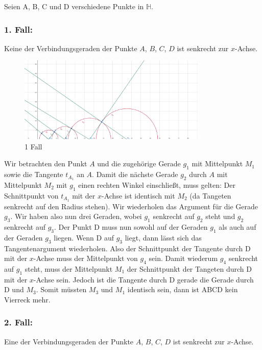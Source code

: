 \documentclass[12pt,a4paper]{article}
\begin{document}
\newpage
\noindent Seien A, B, C und D verschiedene Punkte in $\mathbb{H}$.
\subsubsection*{1. Fall:}
Keine der Verbindungsgeraden der Punkte $A$, $B$, $C$, $D$ ist senkrecht zur $x$-Achse.

\begin{figure}[htbp]
    \centering
    \includegraphics[width=0.8\textwidth]{Blatt08_Aufgabe_22_ia.png}
    \caption{1 Fall}
    \label{fig:Aufgabe_22_ia}
\end{figure}

\noindent Wir betrachten den Punkt $A$ und die zugehörige Gerade $g_1$ mit Mittelpunkt $M_1$ sowie die Tangente $t_{A_1}$ an $A$. Damit die nächste Gerade $g_2$ durch $A$ mit Mittelpunkt $M_2$ mit $g_1$ einen rechten Winkel einschließt, muss gelten: Der Schnittpunkt von $t_{A_1}$ mit der $x$-Achse ist identisch mit $M_2$ (da Tangeten senkrecht auf den Radius stehen). Wir wiederholen das Argument für die Gerade $g_3$. Wir haben also nun drei Geraden, wobei $g_1$ senkrecht auf $g_2$ steht und $g_2$ senkrecht auf $g_3$. Der Punkt D muss nun sowohl auf der Geraden $g_1$ als auch auf der Geraden $g_3$ liegen. Wenn D auf $g_3$ liegt, dann lässt sich das Tangentenargument wiederholen. Also der Schnittpunkt der Tangente durch D mit der $x$-Achse muss der Mittelpunkt von $g_4$ sein. Damit wiederum $g_4$ senkrecht auf $g_1$ steht, muss der Mittelpunkt $M_1$ der Schnittpunkt der Tangeten durch D mit der $x$-Achse sein. Jedoch ist die Tangente durch D gerade die Gerade durch D und $M_3$. Somit müssten $M_3$ und $M_1$ identisch sein, dann ist ABCD kein Vierreck mehr.

\newpage
\subsubsection*{2. Fall:}
Eine der Verbindungsgeraden der Punkte $A$, $B$, $C$, $D$ ist senkrecht zur $x$-Achse.
\end{document}
